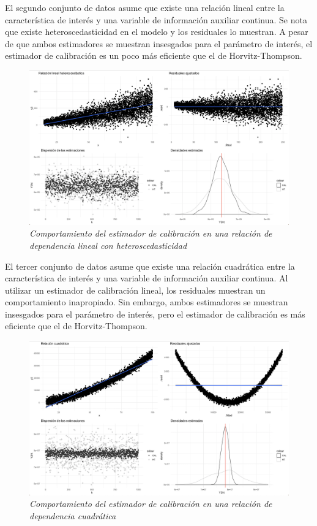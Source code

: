 \documentclass[
  12pt,
]{book}
\begin{document}
El segundo conjunto de datos asume que existe una relación lineal entre la característica de interés y una variable de información auxiliar continua. Se nota que existe heteroscedasticidad en el modelo y los residuales lo muestran. A pesar de que ambos estimadores se muestran insesgados para el parámetro de interés, el estimador de calibración es un poco más eficiente que el de Horvitz-Thompson.

\begin{figure}
\centering
\includegraphics{Pics/c6.png}
\caption{\emph{Comportamiento del estimador de calibración en una relación de dependencia lineal con heteroscedasticidad}}
\end{figure}

El tercer conjunto de datos asume que existe una relación cuadrática entre la característica de interés y una variable de información auxiliar continua. Al utilizar un estimador de calibración lineal, los residuales muestran un comportamiento inapropiado. Sin embargo, ambos estimadores se muestran insesgados para el parámetro de interés, pero el estimador de calibración es más eficiente que el de Horvitz-Thompson.

\begin{figure}
\centering
\includegraphics{Pics/c7.png}
\caption{\emph{Comportamiento del estimador de calibración en una relación de dependencia cuadrática}}
\end{figure}
\end{document}
